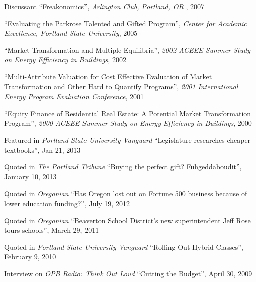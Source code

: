 \documentclass[Computer Science]{vita}
\begin{document}
\begin{vita}
\begin{Selected Presentations and Invited Talks}
  \item Discussant ``Freakonomics'', \emph{Arlington Club, Portland,
      OR }, 2007

  \item ``Evaluating the Parkrose Talented and Gifted Program'',
    \emph{Center for Academic Excellence, Portland State University},
    2005

  \item ``Market Transformation and Multiple Equilibria'', \emph{2002
      ACEEE Summer Study on Energy Efficiency in Buildings}, 2002
	
  \item ``Multi-Attribute Valuation for Cost Effective Evaluation of
    Market Transformation and Other Hard to Quantify Programs'',
    \emph{2001 International Energy Program Evaluation Conference},
    2001
	
  \item ``Equity Finance of Residential Real Estate: A Potential
    Market Transformation Program'', \emph{2000 ACEEE Summer Study on
      Energy Efficiency in Buildings}, 2000

  \end{Selected Presentations and Invited Talks}



  \begin{Selected Media Outreach}
  
  \item Featured in \emph{Portland State University Vanguard} ``Legislature researches cheaper textbooks'', Jan 21, 2013
  
  \item Quoted in \emph{The Portland Tribune} ``Buying the perfect gift? Fuhgeddaboudit'', January 10, 2013
  
\item Quoted in \emph{Oregonian} ``Has Oregon lost out on Fortune 500 business because of lower education funding?'', July 19, 2012

\item Quoted in \emph{Oregonian} ``Beaverton School District's new superintendent Jeff Rose tours schools'', March 29, 2011
  
  \item Quoted in \emph{Portland State University Vanguard} ``Rolling Out Hybrid Classes'', February 9, 2010
  
  \item Interview on \emph{OPB Radio: Think Out Loud} ``Cutting the
    Budget'', April 30, 2009


\end{Selected Media Outreach}
\end{vita}
\end{document}
